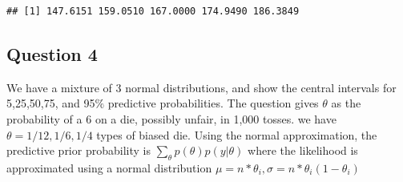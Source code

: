 \documentclass[
]{book}
\theoremstyle{definition}
\theoremstyle{definition}
\theoremstyle{definition}
\theoremstyle{definition}
\theoremstyle{remark}
\begin{document}
\begin{verbatim}
## [1] 147.6151 159.0510 167.0000 174.9490 186.3849
\end{verbatim}

\hypertarget{question-4}{%
\subsection*{Question 4}\label{question-4}}

We have a mixture of 3 normal distributions, and show the central intervals for 5,25,50,75, and 95\(\%\) predictive probabilities. The question gives \(\theta\) as the probability of a 6 on a die, possibly unfair, in 1,000 tosses. we have \(\theta= 1/12,1/6, 1/4\) types of biased die. Using the normal approximation, the predictive prior probability is \(\sum_{\theta}p(\theta)p(y| \theta)\) where the likelihood is approximated using a normal distribution \(\mu = n*\theta_i, \sigma = n*\theta_i(1-\theta_i)\)
\end{document}
